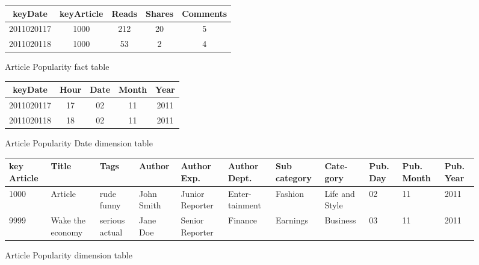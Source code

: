 \begin{figure}[!hbp]
\caption{\label{t:f_artpop}Article Popularity fact table}
\begin{center}
\begin{tabular}{|c|c|c|c|c|}
\hline
keyDate & keyArticle & Reads & Shares & Comments\\
\hline
\hline
2011020117 & 1000 & 212 & 20 & 5\\
2011020118 & 1000 & 53 & 2 & 4\\
\hline
\end{tabular}
\end{center}
\end{figure}

\begin{figure}[!hbp]
\caption{\label{t:art_date}Article Popularity Date dimension table}
\begin{center}
\begin{tabular}{|c|c|c|c|c|}
\hline
keyDate  & Hour & Date & Month & Year\\
\hline
\hline
2011020117 & 17 & 02 & 11 & 2011\\
\hline
2011020118 & 18 & 02 & 11 & 2011\\
\hline
\end{tabular}
\end{center}
\end{figure}


\begin{figure}[!hbp]
\caption{\label{t:art_dim_table}Article Popularity dimension table }
\begin{center}
\begin{tabular}{|p{1cm}|p{1cm}|p{1cm}|p{1.25cm}|p{1.25cm}|p{1.25cm}|p{1.35cm}|p{1.3cm}|p{0.7cm}|p{1.05cm}|p{0.9cm}|}
\hline
key Article & Title & Tags & Author & Author Exp. & Author Dept. & Sub category & Cate- gory & Pub. Day & Pub. Month & Pub. Year\\
\hline
\hline
1000 & Article  & rude funny & John Smith & Junior Reporter & Enter- tainment & Fashion & Life and Style & 02 & 11 & 2011\\
\hline
9999 & Wake the economy & serious actual&Jane Doe & Senior Reporter & Finance & Earnings & Business & 03 & 11 & 2011\\
\hline
\end{tabular}
\end{center}
\end{figure}
